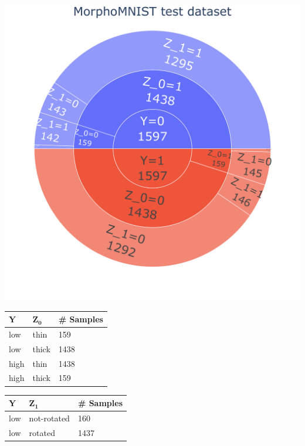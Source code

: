 \documentclass[12pt,DIV14,BCOR12mm,a4paper,footinclude=false,headinclude,parskip=half-,twoside,openright,cleardoublepage=empty,toc=index,bibliography=totoc,listof=totoc]{scrreprt}
\numberwithin{equation}{chapter}
\begin{document}
\begin{table}[H]
    \begin{minipage}[H]{\linewidth}
        \centering
        \begin{minipage}[H]{0.5\linewidth}
            \centering
            \includegraphics[width=0.8\linewidth]{thesis/figures/data_distribution_MorphoMNIST_test_dataset_3.pdf}
        \end{minipage}%
        \hfill
        \begin{minipage}[H]{0.5\linewidth}
            \centering
            \small
            \begin{tabular}{|p{1cm}|p{2cm}|p{2cm}|}
                \hline
                $\mathbf{Y}$ & $\mathbf{Z_0}$ & \# \textbf{Samples } \\
                \hline
                low & thin & 159 \\
                low & thick & 1438\\
                high & thin & 1438 \\
                high & thick & 159\\
                \hline
            \end{tabular}
            \begin{tabular}{|p{1cm}|p{2cm}|p{2cm}|}
                \hline
                $\mathbf{Y}$ & $\mathbf{Z_1}$ & \# \textbf{Samples } \\
                \hline
                low & not-rotated & 160\\
                low & rotated & 1437\\

\end{tabular}
\end{minipage}
\end{minipage}
\end{table}
\end{document}
